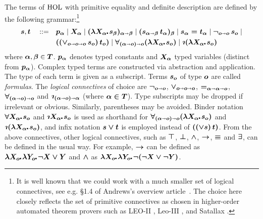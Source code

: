 \begin{defn}\label{holgrammar}
The terms of $\text{\textrm{HOL}}$ with primitive equality and
definite description are defined by the following
grammar:\footnote{It is well known that we could work with a much smaller set
  of logical connectives, see e.g. \S1.4 of Andrews's overview
  article~\cite{AndrewsSEP}. The choice here closely reflects the
  set of primitive connectives as chosen in higher-order automated theorem provers such
  as LEO-II \cite{LEO}, Leo-III \cite{Leo-III}, and Satallax \cite{Satallax}.}
\begin{align*} 
  \hol{s},\hol{t} \quad ::= \quad & \hol{p_\alpha} \mid \hol{X_\alpha} \mid \hol{(\lam{X_\alpha}
  s_\beta)_{\alpha\ar\beta}} \mid \hol{(s_{\alpha\ar\beta}\,
                                    t_\alpha)_\beta} \mid
                                    \hol{s_\alpha = t_\alpha} \mid
                                    \hol{\neg_{o\ar o}\, s_o} \mid\\
  & \hol{(({\vee_{o\ar o\ar o}}\,s_o)\,t_o)} \mid \hol{\forall_{(\alpha\ar
    o)\ar o}(\lam{X_\alpha} s_o)} \mid \hol{\Descr(\lam{X_\alpha} s_o)}
\end{align*}
where $\boldsymbol{\alpha},\boldsymbol{\beta}\in \boldsymbol{T}$. $\boldsymbol{p_\alpha}$ denotes typed constants and
$\boldsymbol{X_\alpha}$ typed variables (distinct from $\boldsymbol{p_\alpha}$).  Complex typed
terms are constructed via abstraction and application. The type of
each term is given as a subscript.  Terms $\boldsymbol{s_o}$ of type $\boldsymbol{o}$ are called
\emph{formulas}.  The \emph{logical connectives} of choice are
$\boldsymbol{\neg_{o\shortrightarrow o}}$, $\boldsymbol{\vee_{o\shortrightarrow
  o\shortrightarrow o}}$, $\boldsymbol{=_{\alpha\shortrightarrow\alpha\shortrightarrow  o}}$, $\boldsymbol{\forall_{(\alpha\shortrightarrow
  o)\shortrightarrow o}}$ and $\hol{\Descr_{(\alpha\ar
  o)\ar \alpha}}$ (where $\boldsymbol{\alpha\in T}$).  Type subscripts may be dropped if
irrelevant or obvious. Similarly, parentheses may be avoided.  Binder
notation $\hol{\all{X_\alpha} s_o}$ and $\hol{\Descr {X_\alpha}\lambdot s_o}$ is used as shorthand for
$\hol{\forall_{(\alpha\ar o)\ar o}
(\lam{X_\alpha} s_o)}$ and $\hol{\Descr(\lam{X_\alpha} s_o)}$, and infix notation $\boldsymbol{s \vee t}$ is employed
instead of $\boldsymbol{((\vee s)\, t)}$. From the above connectives, other logical
connectives, such as $\boldsymbol{\top}$, $\boldsymbol{\bot}$, $\boldsymbol{\wedge}$,
$\boldsymbol{\rightarrow}$, $\boldsymbol{\equiv}$ and $\boldsymbol{\exists}$, can be defined in
the usual way. For example, $\boldsymbol{\rightarrow}$ can be defined as $\hol{\lam{X_o}\lam{Y_o}
  \neg X \vee Y}$ and $\boldsymbol{\wedge}$ as $\hol{\lam{X_o}\lam{Y_o}
  \neg (\neg X \vee \neg Y)}$.
\end{defn}

